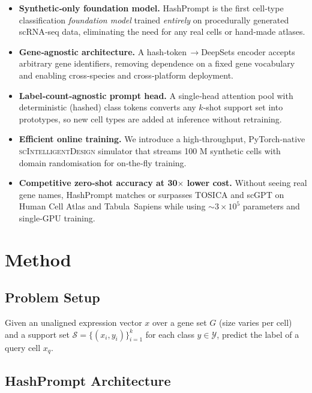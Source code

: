 \documentclass{article}
\begin{document}
%
\begin{itemize}
\item \textbf{Synthetic‑only foundation model.}  
HashPrompt is the first cell‑type classification \emph{foundation model} trained \emph{entirely} on procedurally generated scRNA‑seq data, eliminating the need for any real cells or hand‑made atlases.
\item \textbf{Gene‑agnostic architecture.}  
A hash‑token\,\(\rightarrow\)DeepSets encoder accepts arbitrary gene identifiers, removing dependence on a fixed gene vocabulary and enabling cross‑species and cross‑platform deployment.
\item \textbf{Label‑count‑agnostic prompt head.}  
A single‑head attention pool with deterministic (hashed) class tokens converts any \(k\)-shot support set into prototypes, so new cell types are added at inference without retraining.
\item \textbf{Efficient online training.}  
We introduce a high‑throughput, PyTorch‑native \textsc{scIntelligentDesign} simulator that streams 100 M synthetic cells with domain randomisation for on‑the‑fly training.
\item \textbf{Competitive zero‑shot accuracy at 30\(\times\) lower cost.}  
Without seeing real gene names, HashPrompt matches or surpasses TOSICA and scGPT on Human Cell Atlas and Tabula~Sapiens while using \(\sim\!3\times10^{5}\) parameters and single‑GPU training.
\end{itemize}


\section{Method}
\subsection{Problem Setup}
Given an unaligned expression vector \(x\) over a gene set \(G\) (size varies per cell) and a support set 
\(\mathcal{S}=\{(x_i, y_i)\}_{i=1}^{k}\) for each class \(y\in\mathcal{Y}\), predict the label of a query cell \(x_q\).

\subsection{HashPrompt Architecture}
\end{document}
